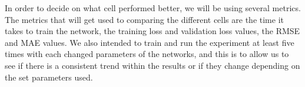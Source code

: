 \documentclass[a4paper,10pt]{article}
\begin{document}
	In order to decide on what cell performed better, we will be using several metrics. The metrics that will get used to comparing the different cells are the time it takes to train the network, the training loss and validation loss values, the RMSE and MAE values. We also intended to train and run the experiment at least five times with each changed parameters of the networks, and this is to allow us to see if there is a consistent trend within the results or if they change depending on the set parameters used.
	
	
\medskip
\newpage
	
	




\end{document}
